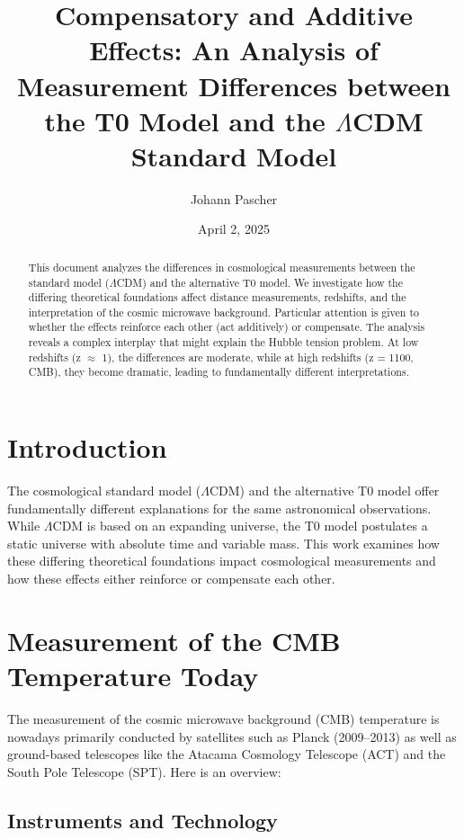 \documentclass[a4paper,12pt]{article}
\theoremstyle{definition}
\theoremstyle{remark}
\begin{document}
	
	\title{Compensatory and Additive Effects: An Analysis of Measurement Differences between the T0 Model and the $\Lambda$CDM Standard Model}
	\author{Johann Pascher}
	\date{April 2, 2025}
	\maketitle
	
	\begin{abstract}
		This document analyzes the differences in cosmological measurements between the standard model ($\Lambda$CDM) and the alternative T0 model. We investigate how the differing theoretical foundations affect distance measurements, redshifts, and the interpretation of the cosmic microwave background. Particular attention is given to whether the effects reinforce each other (act additively) or compensate. The analysis reveals a complex interplay that might explain the Hubble tension problem. At low redshifts (z $\approx$ 1), the differences are moderate, while at high redshifts (z = 1100, CMB), they become dramatic, leading to fundamentally different interpretations.
	\end{abstract}
	
	\tableofcontents
	\newpage
	
	\section{Introduction}
	
	The cosmological standard model ($\Lambda$CDM) and the alternative T0 model offer fundamentally different explanations for the same astronomical observations. While $\Lambda$CDM is based on an expanding universe, the T0 model postulates a static universe with absolute time and variable mass. This work examines how these differing theoretical foundations impact cosmological measurements and how these effects either reinforce or compensate each other.
	
	\section{Measurement of the CMB Temperature Today}
	
	The measurement of the cosmic microwave background (CMB) temperature is nowadays primarily conducted by satellites such as Planck (2009–2013) as well as ground-based telescopes like the Atacama Cosmology Telescope (ACT) and the South Pole Telescope (SPT). Here is an overview:
	
	\subsection{Instruments and Technology}
	
\end{document}
